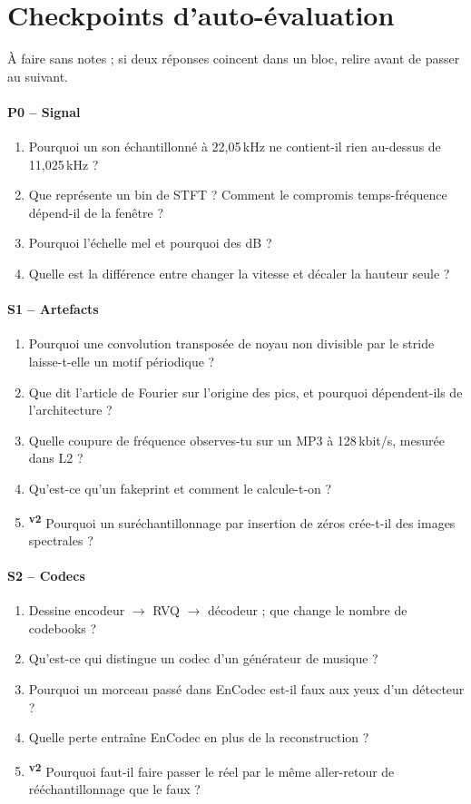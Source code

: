 \documentclass[11pt,a4paper]{article}
\providecommand{\og}{\guillemotleft\nobreakspace}%
\providecommand{\fg}{\nobreakspace\guillemotright}}
\newcommand{\vtwo}{\textsuperscript{\textcolor{orange!80!black}{\textbf{v2}}}}
\begin{document}
\section{Checkpoints d'auto-évaluation}\label{sec:checks}

À faire sans notes ; si deux réponses coincent dans un bloc, relire avant de passer au suivant.

\paragraph{P0 -- Signal}
\begin{enumerate}
\item Pourquoi un son échantillonné à 22,05\,kHz ne contient-il rien au-dessus de 11,025\,kHz ?
\item Que représente un bin de STFT ? Comment le compromis temps-fréquence dépend-il de la fenêtre ?
\item Pourquoi l'échelle mel et pourquoi des dB ?
\item Quelle est la différence entre changer la vitesse et décaler la hauteur seule ?
\end{enumerate}

\paragraph{S1 -- Artefacts}
\begin{enumerate}
\item Pourquoi une convolution transposée de noyau non divisible par le stride laisse-t-elle un motif périodique ?
\item Que dit l'article de Fourier sur l'origine des pics, et pourquoi dépendent-ils de l'architecture ?
\item Quelle coupure de fréquence observes-tu sur un MP3 à 128\,kbit/s, mesurée dans L2 ?
\item Qu'est-ce qu'un fakeprint et comment le calcule-t-on ?
\item \vtwo{} Pourquoi un suréchantillonnage par insertion de zéros crée-t-il des images spectrales ?
\end{enumerate}

\paragraph{S2 -- Codecs}
\begin{enumerate}
\item Dessine encodeur $\rightarrow$ RVQ $\rightarrow$ décodeur ; que change le nombre de codebooks ?
\item Qu'est-ce qui distingue un codec d'un générateur de musique ?
\item Pourquoi un morceau passé dans EnCodec est-il \og{}faux\fg{} aux yeux d'un détecteur ?
\item Quelle perte entraîne EnCodec en plus de la reconstruction ?
\item \vtwo{} Pourquoi faut-il faire passer le réel par le même aller-retour de rééchantillonnage que le faux ?
\end{enumerate}
\end{document}
